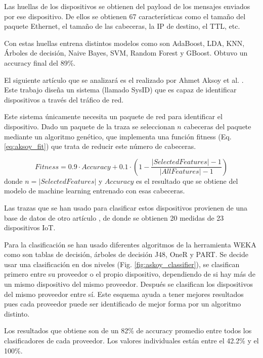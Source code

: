 Las huellas de los dispositivos se obtienen del payload de los mensajes enviados por ese dispositivo. De ellos se obtienen 67 características como el tamaño del paquete Ethernet, el tamaño de las cabeceras, la IP de destino, el TTL, etc.

Con estas huellas entrena distintos modelos como son AdaBoost, LDA, KNN, Árboles de decisión, Naive Bayes, SVM, Random Forest y GBoost. Obtuvo un accuracy final del 89\%.

El siguiente artículo que se analizará es el realizado por Ahmet Aksoy et al. \cite{aksoy2019automated}. Este trabajo diseña un sistema (llamado SysID) que es capaz de identificar dispositivos a través del tráfico de red. 

Este sistema únicamente necesita un paquete de red para identificar el dispositivo. Dado un paquete de la traza se seleccionan $n$ cabeceras del paquete mediante un algoritmo genético, que implementa una función fitness (Eq. \ref{eq:aksoy_fit}) que trata de reducir este número de cabeceras. 

\begin{equation}
    Fitness = 0.9 \cdot Accuracy + 0.1 \cdot \left( 1 - \frac{\lvert SelectedFeatures \rvert - 1}{\lvert AllFeatures \rvert - 1} \right)
    \label{eq:aksoy_fit}
\end{equation}
donde $n = \lvert SelectedFeatures \rvert$ y $Accuracy$ es el resultado que se obtiene del modelo de machine learning entrenado con esas cabeceras.

Las trazas que se han usado para clasificar estos dispositivos provienen de una base de datos de otro artículo \cite{miettinen2017iot}, de donde se obtienen 20 medidas de 23 dispositivos IoT.

Para la clasificación se han usado diferentes algoritmos de la herramienta WEKA \cite{hall2009weka} como son tablas de decisión, árboles de decisión J48, OneR y PART. Se decide usar una clasificación en dos niveles (Fig. \ref{fig:askoy_classifier}), se clasifican primero entre su proveedor o el propio dispositivo, dependiendo de si hay más de un mismo dispositivo del mismo proveedor. Después se clasifican los dispositivos del mismo proveedor entre sí. Este esquema ayuda a tener mejores resultados pues cada proveedor puede ser identificado de mejor forma por un algoritmo distinto.

Los resultados que obtiene son de un 82\% de accuracy promedio entre todos los clasificadores de cada proveedor. Los valores individuales están entre el 42.2\% y el 100\%.

